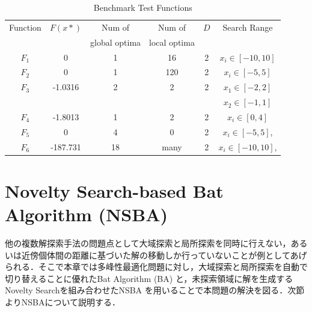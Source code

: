 \documentclass[a4j,11pt]{jarticle}
\begin{document}
\begin{table}[h]
\caption{Benchmark Test Functions}
\begin{center}
\begin{tabular}{c|c|c|c|c|c}
\hline

Function & $F(x*)$ & Num of & Num of & $D$ & Search Range \\
& & global optima & local optima & & \\
\hline
$F_1$ & 0 & 1 & 16 &  2 & $x_i \in [-10,10]$  \\
\hline
$F_2$ & 0 & 1 & 120 & 2 & $x_i \in [-5,5]$  \\
\hline
$F_3$ & -1.0316 & 2 & 2 & 2 & $x_1 \in [-2,2]$  \\
& & & & & $x_2 \in [-1,1]$ \\
\hline
$F_4$ & -1.8013 & 1 & 2 & 2 & $x_i \in [0,4]$  \\
\hline
$F_5$ & 0 & 4 & 0 & 2 & $x_i \in [-5,5]$, \\
\hline
$F_6$ & -187.731 & 18 & many & 2 & $x_i \in [-10,10]$, \\
\hline
\end{tabular}
\label{tab:minMOP}
\end{center}
\end{table}


\FloatBarrier



\clearpage
\newpage
\section{Novelty Search-based Bat Algorithm (NSBA)}
\label{sec:NSBA}

他の複数解探索手法の問題点として大域探索と局所探索を同時に行えない，あるいは近傍個体間の距離に基づいた解の移動しか行っていないことが例としてあげられる．そこで本章では多峰性最適化問題に対し，大域探索と局所探索を自動で切り替えることに優れたBat Algorithm (BA) と，未探索領域に解を生成するNovelty Searchを組み合わせたNSBA \cite{NSBA} を用いることで本問題の解決を図る．次節よりNSBAについて説明する．
\end{document}
